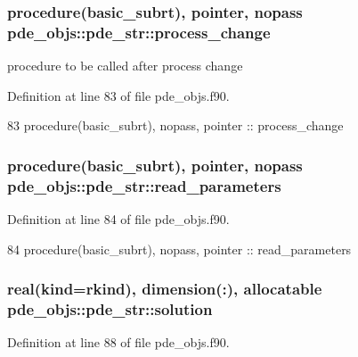 \subsubsection[{process\+\_\+change}]{\setlength{\rightskip}{0pt plus 5cm}procedure({\bf basic\+\_\+subrt}), pointer, nopass pde\+\_\+objs\+::pde\+\_\+str\+::process\+\_\+change}\label{structpde__objs_1_1pde__str_ae2d5de8e9f3733fe98c031cf7cc825e5}


procedure to be called after process change 



Definition at line 83 of file pde\+\_\+objs.\+f90.


\begin{DoxyCode}
83     \textcolor{keywordtype}{procedure}(basic_subrt), \textcolor{keywordtype}{nopass}, \textcolor{keywordtype}{pointer}          :: process\_change
\end{DoxyCode}
\subsubsection[{read\+\_\+parameters}]{\setlength{\rightskip}{0pt plus 5cm}procedure({\bf basic\+\_\+subrt}), pointer, nopass pde\+\_\+objs\+::pde\+\_\+str\+::read\+\_\+parameters}\label{structpde__objs_1_1pde__str_a41b2ce9db30f6409ea8f5f9d329436bd}


Definition at line 84 of file pde\+\_\+objs.\+f90.


\begin{DoxyCode}
84     \textcolor{keywordtype}{procedure}(basic_subrt), \textcolor{keywordtype}{nopass}, \textcolor{keywordtype}{pointer}          :: read\_parameters
\end{DoxyCode}
\subsubsection[{solution}]{\setlength{\rightskip}{0pt plus 5cm}real(kind=rkind), dimension(\+:), allocatable pde\+\_\+objs\+::pde\+\_\+str\+::solution}\label{structpde__objs_1_1pde__str_a3e726ae665eb7e4d810d17fe9a9f9a27}


Definition at line 88 of file pde\+\_\+objs.\+f90.


